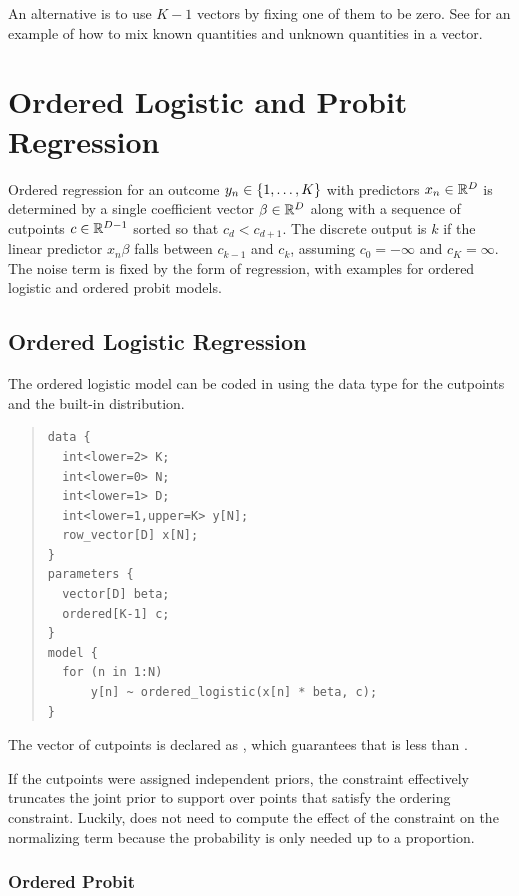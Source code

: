 An alternative is to use $K-1$ vectors by fixing one of them to be
zero.  See  for an example of
how to mix known quantities and unknown quantities in a vector.


\section{Ordered Logistic and Probit Regression}\label{ordered-logistic.section}

Ordered regression for an outcome $y_n \in \{ 1,\ldots,K \}$ with
predictors $x_n \in \mathbb{R}^D$ is determined by a single coefficient
vector $\beta \in \mathbb{R}^D$ along with a sequence of cutpoints $c \in
\mathbb{R}^{D-1}$ sorted so that $c_d < c_{d+1}$.  The discrete output is
$k$ if the linear predictor $x_n \beta$ falls between $c_{k-1}$ and
$c_k$, assuming $c_0 = -\infty$ and $c_K = \infty$.  The noise term is
fixed by the form of regression, with examples for ordered logistic
and ordered probit models.  

\subsection{Ordered Logistic Regression}

The ordered logistic model can be coded in \Stan using the
 data type for the cutpoints and the built-in
 distribution.
%
\begin{quote}
\begin{Verbatim} 
data {
  int<lower=2> K;
  int<lower=0> N;
  int<lower=1> D;
  int<lower=1,upper=K> y[N];
  row_vector[D] x[N];
} 
parameters {
  vector[D] beta;
  ordered[K-1] c;
} 
model {
  for (n in 1:N)
      y[n] ~ ordered_logistic(x[n] * beta, c);
}
\end{Verbatim}
\end{quote}
% 
The vector of cutpoints  is declared as ,
which guarantees that  is less than . 

If the cutpoints were assigned independent priors, the constraint
effectively truncates the joint prior to support over points that
satisfy the ordering constraint.  Luckily, \Stan does not need to
compute the effect of the constraint on the normalizing term because
the probability is only needed up to a proportion.


\subsubsection{Ordered Probit}

